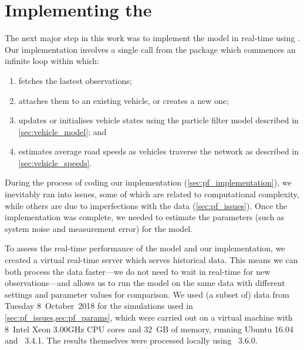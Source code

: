 \section{Implementing the \rt{} \pf{}}
\label{sec:particle-filter}


The next major step in this work was to implement the model in real-time using \Cpp{}. Our implementation involves a single call from the \Rstats{} package  which commences an infinite loop within \Cpp{} which:
\begin{enumerate}
\item fetches the lastest observations;
\item attaches them to an existing vehicle, or creates a new one;
\item updates or initialises vehicle states using the particle filter model described in \cref{sec:vehicle_model}; and
\item estimates average road speeds as vehicles traverse the network as described in \cref{sec:vehicle_speeds}.
\end{enumerate}
During the process of coding our implementation (\cref{sec:pf_implementation}), we inevitably ran into issues, some of which are related to computational complexity, while others are due to imperfections with the data (\cref{sec:pf_issues}). Once the implementation was complete, we needed to estimate the parameters (such as system noise and measurement error) for the model.


To assess the real-time performance of the model and our \pf{} implementation, we created a virtual real-time server which serves historical data. This means we can both process the data faster---we do not need to wait in real-time for new observations---and allows us to run the model on the same data with different settings and parameter values for comparison. We used (a subset of) data from Tuesday 8~October~2018 for the simulations used in \cref{sec:pf_issues,sec:pf_params}, which were carried out on a virtual machine with 8~Intel Xeon 3.00GHz CPU cores and 32~GB of memory, running Ubuntu 16.04 and \Rstats{}~3.4.1. The results themselves were processed locally using \Rstats{}~3.6.0.









